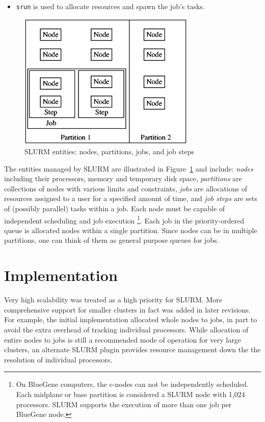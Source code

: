 \documentclass[10pt,twocolumn,times]{../common/llncs}
\begin{document}
{\begin{itemize}
\item {\tt srun} is used to allocate resources and spawn the job's tasks.
\end{itemize}

\begin{figure}[tcb]
\centerline{\includegraphics[width=3.32in]{../figures/entities2.eps}}
\caption{\small SLURM entities: nodes, partitions, jobs, and job steps}
\label{entities}
\end{figure}

The entities managed by SLURM are illustrated in Figure~\ref{entities} 
and include:
{\em nodes} including their processors, memory and temporary disk space,
{\em partitions} are collections of nodes with various limits and constraints,
{\em jobs} are allocations of resources assigned
to a user for a specified amount of time, and
{\em job steps} are sets of (possibly parallel) tasks within a job.
Each node must be capable of independent scheduling and job execution
\footnote{On BlueGene computers, the c-nodes can not be independently 
scheduled. Each midplane or base partition is considered a SLURM node 
with 1,024 processors. SLURM supports the execution of more than one 
job per BlueGene node.}.
Each job in the priority-ordered queue is allocated nodes within a single 
partition.
Since nodes can be in multiple partitions, one can think of them as 
general purpose queues for jobs. 

\section{Implementation}

Very high scalability was treated as a high priority for SLURM. 
More comprehensive support for smaller clusters in fact was 
added in later revisions.
For example, the initial implementation allocated whole nodes 
to jobs, in part to avoid the extra overhead of tracking individual
processors.
While allocation of entire nodes to jobs is still a recommended mode of 
operation for very large clusters, an alternate SLURM plugin provides 
resource management down the the resolution of individual processors.

}
\end{document}
